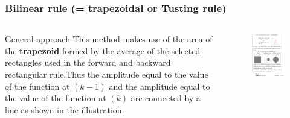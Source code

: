 \begin{frame}
	\frametitle{Bilinear rule (= trapezoidal or Tusting rule)}
\begin{columns}
	\begin{column}{0.5\textwidth}
		\begin{block}{General approach}
			This method makes use of the area of the \textbf{trapezoid} formed by the average of the selected rectangles used in the forward and backward rectangular rule.Thus the amplitude equal to the value of the function at $(k-1)$ and the amplitude equal to the value of the function at $(k)$ are connected by a line as shown in the illustration.
		\end{block}	
	\end{column}

	\begin{column}{0.5\textwidth}
		\begin{figure}
			\centering
			\includegraphics[width=1\linewidth]{T_euler}
		\end{figure}
	\end{column}	
\end{columns}
\end{frame}

